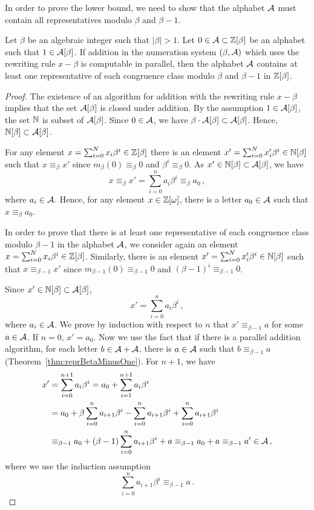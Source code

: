 In order to prove the lower bound, we need to show that the alphabet $\mathcal{A}$ must contain all representatives modulo $\beta$ and $\beta-1$. 
\begin{thm}
Let $\beta$ be an algebraic integer such that $|\beta|>1$. Let $0\in \mathcal{A}\subset \mathbb{Z}[\beta]$ be an alphabet such that $1\in \mathcal{A}[\beta]$. If addition in the numeration system $(\beta, \mathcal{A})$ which uses the rewriting rule $x-\beta$ is computable in parallel, then the alphabet $\mathcal{A}$ contains at least one representative of each congruence class modulo $\beta$ and $\beta-1$ in $\mathbb{Z}[\beta]$. 
\label{thm:representativesInAlphabet}
\end{thm}
\begin{proof}
The existence of an algorithm for addition with the rewriting rule $x-\beta$ implies that the set $\mathcal{A}[\beta]$ is closed under addition. By the assumption $1\in \mathcal{A}[\beta]$, the set $\mathbb{N}$ is subset of  $\mathcal{A}[\beta]$. Since $0\in\mathcal{A}$, we have $\beta \cdot \mathcal{A}[\beta] \subset \mathcal{A}[\beta]$. Hence, $\mathbb{N}[\beta] \subset \mathcal{A}[\beta]$.

For any element  $x=\sum_{i=0}^N x_i \beta^i\in \mathbb{Z}[\beta]$ there is an element $x'=\sum_{i=0}^N x'_i \beta^i\in \mathbb{N}[\beta]$ such that $x\equiv_\beta x'$  since $m_\beta (0)\equiv_\beta 0$ and $\beta^i\equiv_\beta 0$. As $x'\in \mathbb{N}[\beta] \subset \mathcal{A}[\beta]$, we have
$$
x\equiv_\beta x'=\sum_{i=0}^{n}a_i\beta^i \equiv_\beta a_0\,,
$$
where $a_i\in \mathcal{A}$. Hence, for any element $x\in\mathbb{Z}[\omega]$, there is a letter $a_0\in\mathcal{A}$ such that $x\equiv_\beta a_0$.

In order to prove that there is at least one representative of each congruence class modulo $\beta-1$ in the alphabet $\mathcal{A}$, we consider again an element $x=\sum_{i=0}^N x_i \beta^i\in \mathbb{Z}[\beta]$. Similarly, there is an element $x'=\sum_{i=0}^N x'_i \beta^i\in \mathbb{N}[\beta]$ such that $x\equiv_{\beta-1} x'$  since $m_{\beta-1} (0)\equiv_{\beta-1} 0$ and $(\beta-1)^i\equiv_{\beta-1} 0$.

Since $x'\in \mathbb{N}[\beta]\subset \mathcal{A}[\beta]$,
$$
x'=\sum_{i=0}^{n}a_i\beta^i\,,
$$
where $a_i\in \mathcal{A}$. We prove by induction with respect to $n$ that $x'\equiv_{\beta-1} a$ for some $a\in\mathcal{A}$.
If $n=0$, $x'=a_0$. Now we use the fact that if there is a parallel addition algorithm, for each letter $b \in\mathcal{A}+\mathcal{A}$, there is $a\in\mathcal{A}$ such that $b \equiv_{\beta-1} a$ (Theorem~\ref{thm:reprBetaMinusOne}). For $n+1$, we have
\begin{align*}
x'&=\sum_{i=0}^{n+1}a_i\beta^i =a_0 + \sum_{i=1}^{n+1}a_{i}\beta^i\\
    &=a_0 + \beta \sum_{i=0}^{n}a_{i+1}\beta^i - \sum_{i=0}^{n}a_{i+1}\beta^i+ \sum_{i=0}^{n}a_{i+1}\beta^i \\
    &\equiv_{\beta-1} a_0 + (\beta-1)\sum_{i=0}^{n}a_{i+1}\beta^i + a \equiv_{\beta-1}a_0 +a \equiv_{\beta-1}a' \in\mathcal{A}\,,
\end{align*}
where we use the induction assumption
$$
\sum_{i=0}^{n}a_{i+1}\beta^i\equiv_{\beta-1} a\,.
$$
\end{proof}

